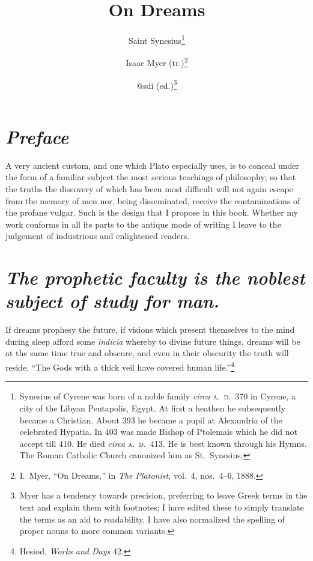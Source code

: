 \documentclass[12pt]{article}
\title{\Huge\swshape On Dreams}
\author{Saint Synesius\footnote{Synesius of Cyrene was born of a noble family
\textit{circa} \textsc{a.~d.}~370 in Cyrene, a city of the Libyan Pentapolis,
Egypt. At first a heathen he subsequently became a Christian. About 393 he
became a pupil at Alexandria of the celebrated Hypatia. In 403 was made Bishop
of Ptolemais which he did not accept till 410. He died \textit{circa}
\textsc{a.~d.}~413. He is best known through his Hymns. The Roman Catholic
Church canonized him as St.~Synesius.} \and Isaac Myer (tr.)\footnote{I.~Myer,
``On Dreams,'' in \textit{The Platonist,} vol.~4, nos.~4--6, 1888.} \and @sdi
(ed.)\footnote{Myer has a tendency towards precision, preferring to leave Greek
terms in the text and explain them with footnotes; I have edited these to
simply translate the terms as an aid to readability. I have also normalized
the spelling of proper nouns to more common variants.}}
\date{}
\begin{document}
\maketitle

\section*{\mdseries\itshape Preface}

A very ancient custom, and one which Plato especially uses, is to conceal under
the form of a familiar subject the most serious teachings of philosophy; so
that the truths the discovery of which has been most difficult will not again
escape from the memory of men nor, being disseminated, receive the
contaminations of the profane vulgar. Such is the design that I propose in this
book. Whether my work conforms in all its parts to the antique mode of writing
I leave to the judgement of industrious and enlightened readers.


\section{\mdseries\itshape The prophetic faculty is the noblest subject of
study for man.}

If dreams prophesy the future, if visions which present themselves to the mind
during sleep afford some \textit{indicia} whereby to divine future things,
dreams will be at the same time true and obscure, and even in their obscurity
the truth will reside. ``The Gods with a thick veil have covered human
life.''\footnote{Hesiod, \textit{Works and Days} 42.}
\end{document}
